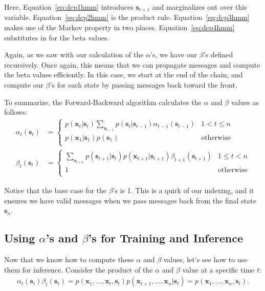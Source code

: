Here, Equation~\eqref{eq:dcp1hmm} introduces $\textbf{s}_{t+1}$ and marginalizes out over this variable.
Equation~\eqref{eq:dcp2hmm} is the product rule. Equation~\eqref{eq:dcp3hmm} makes use of the Markov property in two places. Equation~\eqref{eq:dcp4hmm} substitutes in for the beta values.

Again, as we saw with our calculation of the $\alpha$'s, we have our $\beta$'s defined recursively. Once again, this means that we can propagate messages and compute the beta values
efficiently. In this case, we start at the end of the chain, and compute our $\beta$'s for each state by passing messages back toward the front.

To summarize, the Forward-Backward algorithm calculates the $\alpha$ and $\beta$ values as follows:\
%
\begin{align*}
	\alpha_t(\textbf{s}_t) &=
	\begin{cases} 
      p(\textbf{x}_t | \textbf{s}_t) \sum_{\textbf{s}_{t-1}} p(\textbf{s}_t | \textbf{s}_{t-1}) \alpha_{t-1}(\textbf{s}_{t-1}) & 1 < t \leq n \\
      p(\textbf{x}_1 | \textbf{s}_{1}) p(\textbf{s}_1) & \text{otherwise} \\
   \end{cases} \\
   \beta_t(\textbf{s}_t) &=
   \begin{cases} 
      \sum_{\textbf{s}_{t+1}} p(\textbf{s}_{t+1} | \textbf{s}_t) p(\textbf{x}_{t+1} | \textbf{s}_{t+1}) \beta_{t+1}(\textbf{s}_{t+1}) & 1 \leq t < n \\
      1 & \text{otherwise} \\
   \end{cases}
\end{align*}

\begin{warning}
    Notice that the base case for the $\beta$'s is 1. This is a quirk of our indexing, and it ensures we have valid messages when we pass messages back from the final state $\textbf{s}_n$.
\end{warning}

\subsection{Using $\alpha$'s and $\beta$'s for Training and Inference}

Now that we know how to compute these $\alpha$ and $\beta$ values,
let's see how to use them for inference.
%
Consider the product of the $\alpha$ and $\beta$ value at a specific time $t$:
%
\begin{align*}
	\alpha_t(\textbf{s}_t) \beta_t(\textbf{s}_t) = p(\textbf{x}_1, ..., \textbf{x}_t, \textbf{s}_t) p(\textbf{x}_{t+1}, ..., \textbf{x}_n | \textbf{s}_t) = p(\textbf{x}_1, ..., \textbf{x}_n, \textbf{s}_t).
\end{align*}

